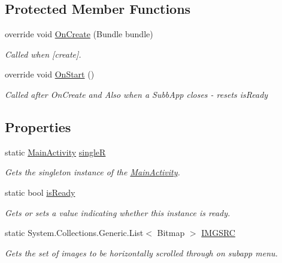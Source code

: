 \subsection*{Protected Member Functions}
\begin{DoxyCompactItemize}
\item 
override void \hyperlink{class_w_c_c_mobile_1_1_main_activity_a2fe5821eafde95e4c73e3f548a83cce2}{On\+Create} (Bundle bundle)
\begin{DoxyCompactList}\small\item\em Called when \mbox{[}create\mbox{]}. \end{DoxyCompactList}\item 
override void \hyperlink{class_w_c_c_mobile_1_1_main_activity_ae1bcf5ddd333e0f1fde16e9219549448}{On\+Start} ()
\begin{DoxyCompactList}\small\item\em Called after On\+Create and Also when a Subb\+App closes -\/ resets is\+Ready \end{DoxyCompactList}\end{DoxyCompactItemize}
\subsection*{Properties}
\begin{DoxyCompactItemize}
\item 
static \hyperlink{class_w_c_c_mobile_1_1_main_activity}{Main\+Activity} \hyperlink{class_w_c_c_mobile_1_1_main_activity_aabc36edadb3768e48df7834bc7204f8e}{singleR}
\begin{DoxyCompactList}\small\item\em Gets the singleton instance of the \hyperlink{class_w_c_c_mobile_1_1_main_activity}{Main\+Activity}. \end{DoxyCompactList}\item 
static bool \hyperlink{class_w_c_c_mobile_1_1_main_activity_a392159539f2848512f11189310be9280}{is\+Ready}
\begin{DoxyCompactList}\small\item\em Gets or sets a value indicating whether this instance is ready. \end{DoxyCompactList}\item 
static System.\+Collections.\+Generic.\+List$<$ Bitmap $>$ \hyperlink{class_w_c_c_mobile_1_1_main_activity_a51b91f0a986746cdd5609722deca9330}{I\+M\+G\+S\+RC}
\begin{DoxyCompactList}\small\item\em Gets the set of images to be horizontally scrolled through on subapp menu. \end{DoxyCompactList}\end{DoxyCompactItemize}


